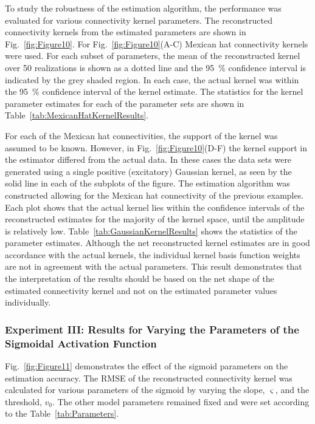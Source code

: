 \documentclass[5p,authoryear]{elsarticle}
\begin{document}
To study the robustness of the estimation algorithm, the performance was evaluated for various connectivity kernel parameters. The reconstructed connectivity kernels from the estimated parameters are shown in Fig.~\ref{fig:Figure10}. For Fig.~\ref{fig:Figure10}(A-C) Mexican hat connectivity kernels were used. For each subset of parameters, the mean of the reconstructed kernel over 50 realizations is shown as a dotted line and the 95~\% confidence interval is indicated by the grey shaded region. In each case, the actual kernel was within the 95~\% confidence interval of the kernel estimate. The statistics for the kernel parameter estimates for each of the parameter sets are shown in Table~\ref{tab:MexicanHatKernelResults}.

For each of the Mexican hat connectivities, the support of the kernel was assumed to be known. However, in Fig.~\ref{fig:Figure10}(D-F) the kernel support in the estimator differed from the actual data. In these cases the data sets were generated using a single positive (excitatory) Gaussian kernel, as seen by the solid line in each of the subplots of the figure. The estimation algorithm was constructed allowing for the Mexican hat connectivity of the previous examples. Each plot shows that the actual kernel lies within the confidence intervals of the reconstructed estimates for the majority of the kernel space, until the amplitude is relatively low. Table~\ref{tab:GaussianKernelResults} shows the statistics of the parameter estimates. Although the net reconstructed kernel estimates are in good accordance with the actual kernels, the individual kernel basis function weights are not in agreement with the actual parameters. This result demonstrates that the interpretation of the results should be based on the net shape of the estimated connectivity kernel and not on the estimated parameter values individually.  

\subsubsection{Experiment III: Results for Varying the Parameters of the Sigmoidal Activation Function}

Fig.~\ref{fig:Figure11} demonstrates the effect of the sigmoid parameters on the estimation accuracy. The RMSE of the reconstructed connectivity kernel was calculated for various parameters of the sigmoid by varying the slope, $\varsigma$, and the threshold, $v_0$. The other model parameters remained fixed and were set according to the Table~\ref{tab:Parameters}.
\end{document}
